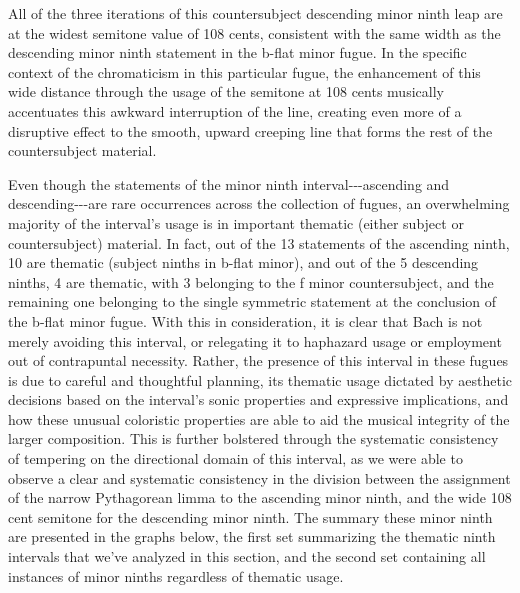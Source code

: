     \begin{center}
    \end{center}
    
    All of the three iterations of this countersubject descending minor
ninth leap are at the widest semitone value of 108 cents, consistent
with the same width as the descending minor ninth statement in the
b-flat minor fugue. In the specific context of the chromaticism in this
particular fugue, the enhancement of this wide distance through the
usage of the semitone at 108 cents musically accentuates this awkward
interruption of the line, creating even more of a disruptive effect to
the smooth, upward creeping line that forms the rest of the
countersubject material.

Even though the statements of the minor ninth interval-\/-\/-ascending
and descending-\/-\/-are rare occurrences across the collection of
fugues, an overwhelming majority of the interval's usage is in important
thematic (either subject or countersubject) material. In fact, out of
the 13 statements of the ascending ninth, 10 are thematic (subject
ninths in b-flat minor), and out of the 5 descending ninths, 4 are
thematic, with 3 belonging to the f minor countersubject, and the
remaining one belonging to the single symmetric statement at the
conclusion of the b-flat minor fugue. With this in consideration, it is
clear that Bach is not merely avoiding this interval, or relegating it
to haphazard usage or employment out of contrapuntal necessity. Rather,
the presence of this interval in these fugues is due to careful and
thoughtful planning, its thematic usage dictated by aesthetic decisions
based on the interval's sonic properties and expressive implications,
and how these unusual coloristic properties are able to aid the musical
integrity of the larger composition. This is further bolstered through
the systematic consistency of tempering on the directional domain of
this interval, as we were able to observe a clear and systematic
consistency in the division between the assignment of the narrow
Pythagorean limma to the ascending minor ninth, and the wide 108 cent
semitone for the descending minor ninth. The summary these minor ninth
are presented in the graphs below, the first set summarizing the
thematic ninth intervals that we've analyzed in this section, and the
second set containing all instances of minor ninths regardless of
thematic usage.


    \begin{center}
    \end{center}
    

